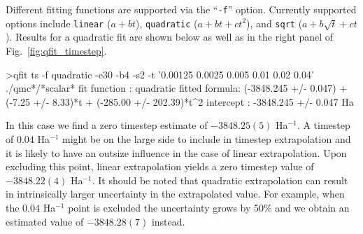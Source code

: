 Different fitting functions are supported via the ``\texttt{-f}'' option.
Currently supported options include \texttt{linear} ($a+bt$),
\texttt{quadratic} ($a+bt+ct^2$), and \texttt{sqrt} ($a+b\sqrt{t}+ct$).
Results for a quadratic fit are shown below as well as in the right
panel of Fig.~\ref{fig:qfit_timestep}.
\begin{shade}
>qfit ts -f quadratic -e30 -b4 -s2 -t '0.00125 0.0025 0.005 0.01 0.02 0.04' ./qmc*/*scalar*
fit function  : quadratic
fitted formula: (-3848.245 +/- 0.047) + (-7.25 +/- 8.33)*t + (-285.00 +/- 202.39)*t^2
intercept     : -3848.245 +/- 0.047  Ha
\end{shade}
In this case we find a zero timestep estimate of $-3848.25(5)$ Ha$^{-1}$.
A timestep of $0.04$ Ha$^{-1}$ might be on the large side to include in
timestep extrapolation and it is likely to have an outsize influence
in the case of linear extrapolation.  Upon excluding this point, linear
extrapolation yields a zero timestep value of $-3848.22(4)$ Ha$^{-1}$.
It should be noted that quadratic extrapolation can result in intrinsically
larger uncertainty in the extrapolated value.  For example, when the $0.04$
Ha$^{-1}$ point is excluded the uncertainty grows by 50\% and we obtain an
estimated value of $-3848.28(7)$ instead.








